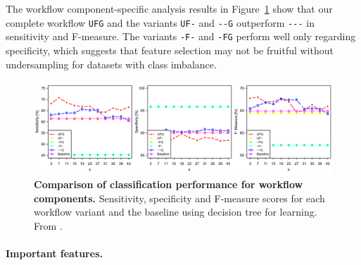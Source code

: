 \documentclass[
  oneside]{book}
\begin{document}
The workflow component-specific analysis results in Figure~\ref{fig:07-perf-wf-components} show that our complete workflow \texttt{UFG} and the variants \texttt{UF-} and \texttt{-\/-G} outperform \texttt{-\/-\/-} in sensitivity and F-measure.
The variants \texttt{-F-} and \texttt{-FG} perform well only regarding specificity, which suggests that feature selection may not be fruitful without undersampling for datasets with class imbalance.



\begin{figure}[htbp]

{\centering \includegraphics[width=1\linewidth]{figures/07-perf-wf-components} 

}

\caption{\textbf{Comparison of classification performance for workflow components.} Sensitivity, specificity and F-measure scores for each workflow variant and the baseline using decision tree for learning. From \autocite{Niemann:CBMS2015}.}\label{fig:07-perf-wf-components}
\end{figure}

\paragraph*{Important features.}
\end{document}

